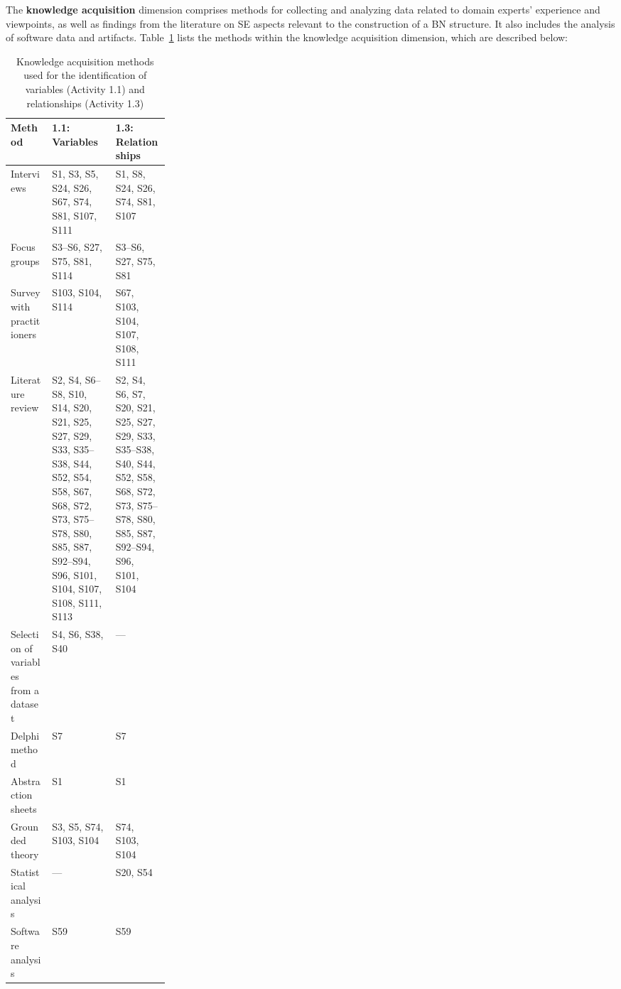 The \textbf{knowledge acquisition} dimension comprises methods for collecting and analyzing data related to domain experts' experience and viewpoints, as well as findings from the literature on SE aspects relevant to the construction of a BN structure. It also includes the analysis of software data and artifacts. Table~\ref{tab:knowledge-acquisition-methods} lists the methods within the knowledge acquisition dimension, which are described below:

\begin{table}[t]
\caption{Knowledge acquisition methods used for the identification of variables (Activity 1.1) and relationships (Activity 1.3)}
\label{tab:knowledge-acquisition-methods}
\centering
\small
\setlength{\tabcolsep}{6pt}
\renewcommand{\arraystretch}{1.2}

\begin{tabularx}{\linewidth}{>{\raggedright\arraybackslash}p{0.26\linewidth}
                              >{\raggedright\arraybackslash}X
                              >{\raggedright\arraybackslash}X}
\toprule
\textbf{Method} & \textbf{1.1: Variables} & \textbf{1.3: Relationships} \\
\midrule
Interviews
& S1, S3, S5, S24, S26, S67, S74, S81, S107, S111
& S1, S8, S24, S26, S74, S81, S107 \\
Focus groups
& S3--S6, S27, S75, S81, S114
& S3--S6, S27, S75, S81 \\
Survey with practitioners
& S103, S104, S114
& S67, S103, S104, S107, S108, S111 \\
Literature review
& S2, S4, S6--S8, S10, S14, S20, S21, S25, S27, S29, S33, S35--S38, S44, S52, S54, S58, S67, S68, S72, S73, S75--S78, S80, S85, S87, S92--S94, S96, S101, S104, S107, S108, S111, S113
& S2, S4, S6, S7, S20, S21, S25, S27, S29, S33, S35--S38, S40, S44, S52, S58, S68, S72, S73, S75--S78, S80, S85, S87, S92--S94, S96, S101, S104 \\
Selection of variables from a dataset
& S4, S6, S38, S40
& --- \\
Delphi method
& S7
& S7 \\
Abstraction sheets
& S1
& S1 \\
Grounded theory
& S3, S5, S74, S103, S104
& S74, S103, S104 \\
Statistical analysis
& ---
& S20, S54 \\
Software analysis
& S59
& S59 \\
\bottomrule
\end{tabularx}
\end{table}

